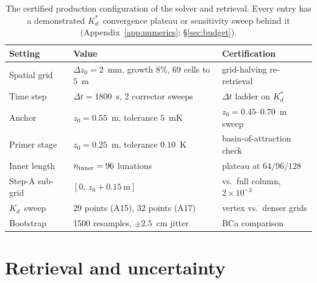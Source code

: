 \documentclass[11pt,a4paper,oneside]{report}
\newcommand{\Kd}{\ensuremath{K_d}}
\newcommand{\Kds}{\ensuremath{K_d^{*}}}
\begin{document}
\begin{table}[h!]
  \centering\small
  \caption[The certified production configuration]{The certified
  production configuration of the solver and retrieval. Every entry
  has a demonstrated \Kds\ convergence plateau or sensitivity sweep
  behind it (Appendix~\ref{app:numerics}; \S\ref{sec:budget}).}
  \label{tab:config}
  \begin{tabular}{lll}
    \toprule
    Setting & Value & Certification \\
    \midrule
    Spatial grid & $\Delta z_0=2$~mm, growth $8\%$, 69 cells to $5$~m & grid-halving re-retrieval \\
    Time step & $\Delta t=1800$~s, 2 corrector sweeps & $\Delta t$ ladder on \Kds \\
    Anchor & $z_0=0.55$~m, tolerance $5$~mK & $z_0=0.45$--$0.70$~m sweep \\
    Primer stage & $z_0=0.25$~m, tolerance $0.10$~K & basin-of-attraction check \\
    Inner length & $n_{\rm inner}=96$ lunations & plateau at $64/96/128$ \\
    Step-A sub-grid & $[0,\,z_0+0.15~\mathrm{m}]$ & vs.\ full column, $2\times10^{-3}$ \\
    \Kd\ sweep & 29 points (A15), 32 points (A17) & vertex vs.\ denser grids \\
    Bootstrap & 1500 resamples, $\pm2.5$~cm jitter & BCa comparison \\
    \bottomrule
  \end{tabular}
\end{table}

\chapter{Retrieval and uncertainty}\label{ch:retrieval}
\end{document}
